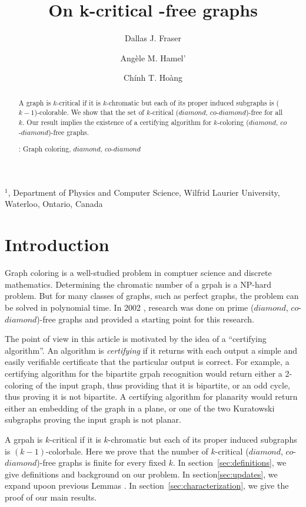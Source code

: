 \documentclass[12pt]{article}
\title{On k-critical {\DCD}-free graphs}
\author{
	Dallas J. Fraser\inst{1}
	\and Ang\`ele M. Hamel'\inst{1}
	\and Ch\'inh T. Ho\`ang\inst{1}
}
\def\inst#1{$^{#1}$}
\def\DCD{($diamond$, $co$-$diamond$)}
\begin{document}
\maketitle

\begin{center}
{\footnotesize

\inst{1}, Department of Physics and Computer Science, Wilfrid Laurier
University, \\Waterloo, Ontario, Canada}

\end{center}

\begin{abstract}
A graph is $k$-critical if it is $k$-chromatic but each of its proper induced subgraphs is ($k-1$)-colorable. We show that the set of $k$-critical {\DCD}-free for all $k$. Our result implies the existence of a certifying algorithm for $k$-coloring {\DCD}-free graphs.

: Graph coloring, $diamond$, $co$-$diamond$
\end{abstract}


\section{Introduction}\label{sec:intro}

Graph coloring is a well-studied problem in comptuer science and discrete mathematics. Determining the chromatic number of a grpah is a NP-hard problem. But for many classes of graphs, such as perfect graphs, the problem can be solved in polynomial time. In 2002 \cite{BraFud2002}, research was done on prime {\DCD}-free graphs and provided a starting point for this research.

The point of view in this article is motivated by the idea of a ``certifying algorithm''. An algorithm is {\it certifying} if it returns with each output a simple and easily verifiable certificate that the particular output is correct. For example, a certifying algorithm for the bipartite grpah recognition would return either a 2-coloring of the input graph, thus providing that it is bipartite, or an odd cycle, thus proving it is not bipartite. A certifying algorithm for planarity would return either an embedding of the graph in a plane, or one of the two Kuratowski subgraphs proving the input graph is not planar.

A grpah is $k$-critical if it is $k$-chromatic but each of its proper induced subgraphs is $(k-1)$-colorbale. Here we prove that the number of $k$-critical {\DCD}-free graphs is finite for every fixed $k$. In section~\ref{sec:definitions}, we give definitions and background on our problem. In section\ref{sec:updates}, we expand upoon previous Lemmas \cite{BraFud2002}. In section~\ref{sec:characterization}, we give the proof of our main results.
\end{document}
